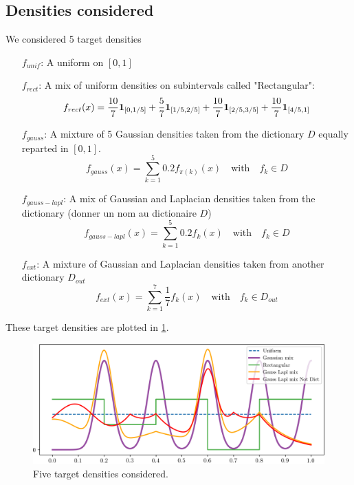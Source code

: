 \subsection{Densities considered}
We considered 5 target densities
\begin{enumerate}
\item[$f_{unif}$:] A uniform on $[0,1]$ 
\item[$f_{rect}$:] A mix of uniform densities on subintervals called "Rectangular":
\begin{equation}
    f_{rect}(x)=\frac{10}{7}\b1_{[0,1/5]}+\frac{5}{7}\b1_{[1/5,2/5]}+
    \frac{10}{7}\b1_{[2/5,3/5]}+\frac{10}{7}\b1_{[4/5,1]}
\end{equation}
\item[$f_{gauss}$:] A mixture of 5 Gaussian densities taken from the dictionary $D$ equally reparted in $[0,1]$.
\begin{equation}
    f_{gauss}(x)=\sum_{k=1}^5 0.2f_{\pi(k)}(x) \quad \text{with}\quad f_k\in D
\end{equation}

\item[$f_{gauss-lapl}$:] A mix of Gaussian and Laplacian densities taken from the dictionary (donner un nom au dictionaire $D$)
\begin{equation}
    f_{gauss-lapl}(x)=\sum_{k=1}^5 0.2f_{k}(x) \quad \text{with}\quad f_k\in D
\end{equation}
\item[$f_{ext}$:] A mixture of Gaussian and Laplacian densities  taken from another dictionary $D_{out}$
\begin{equation}
    f_{ext}(x)=\sum_{k=1}^7 \frac{1}{7}f_{k}(x) \quad \text{with}\quad f_k\in D_{out}
\end{equation}
\end{enumerate}
These target densities are plotted in \cref{fig:target_densities}.
\begin{figure}
\includegraphics[width=1.2\textwidth]{TeX_files/densities_f_star.png}
\caption{Five target densities considered.}
\label{fig:target_densities}
\end{figure}

